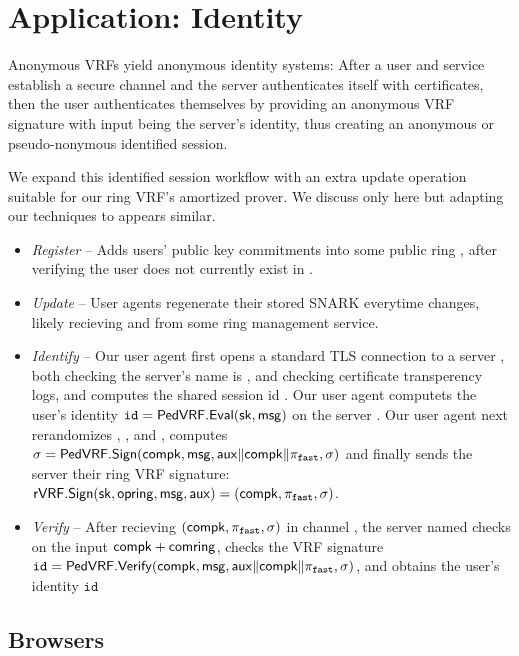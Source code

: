 \section{Application: Identity}

Anonymous VRFs yield anonymous identity systems:
After a user and service establish a secure channel and
the server authenticates itself with certificates, then
the user authenticates themselves by providing an anonymous
VRF signature with input \msg being the server's identity,
thus creating an anonymous or pseudo-nonymous identified session.

We expand this identified session workflow with an extra
update operation suitable for our ring VRF's amortized prover.
We discuss only \pifast here but adapting our techniques to \pisafe appears similar. 

\begin{itemize}
\item {\em Register} --
 Adds users' public key commitments into some public ring \ctx,
 after verifying the user does not currently exist in \ctx.
\item {\em Update} --
 User agents regenerate their stored SNARK \pifast everytime \ctx changes,
 likely recieving \comring and \openring from some ring management service.
\item {\em Identify} --
 Our user agent first opens a standard TLS connection to a server \msg,
 both checking the server's name is \msg, and checking certificate
 transperency logs, and computes the shared session id \aux.
 Our user agent computets the user's identity
  $\mathtt{id} = {\mathsf{PedVRF}}.{\mathsf{Eval}}(\mathsf{sk},\mathsf{msg})$ on the server \msg.
 Our user agent next rerandomizes \pifast, \compk, and \openpk, computes
 $\sigma = {\mathsf{PedVRF}}.{\mathsf{Sign}}(\mathsf{compk},\mathsf{msg},\mathsf{aux} \| \mathsf{compk} \| \pi_{\mathtt{fast}},\sigma)$
 and finally sends the server their ring VRF signature:
 ${\mathsf{rVRF}}.{\mathsf{Sign}}(\mathsf{sk},\mathsf{opring},\mathsf{msg},\mathsf{aux}) = (\mathsf{compk},\pi_{\mathtt{fast}},\sigma)$.
\item {\em Verify} -- 
 After recieving $(\mathsf{compk},\pi_{\mathtt{fast}},\sigma)$ in channel \aux,
 the server named \msg checks \pifast on the input $\mathsf{compk} + \mathsf{comring}$,
 checks the VRF signature
 $\mathtt{id} = {\mathsf{PedVRF}}.{\mathsf{Verify}}(\mathsf{compk},\mathsf{msg},\mathsf{aux} \| \mathsf{compk} \| \pi_{\mathtt{fast}},\sigma)$,
 and obtains the user's identity $\mathtt{id}$
\end{itemize}


\subsection{Browsers}

